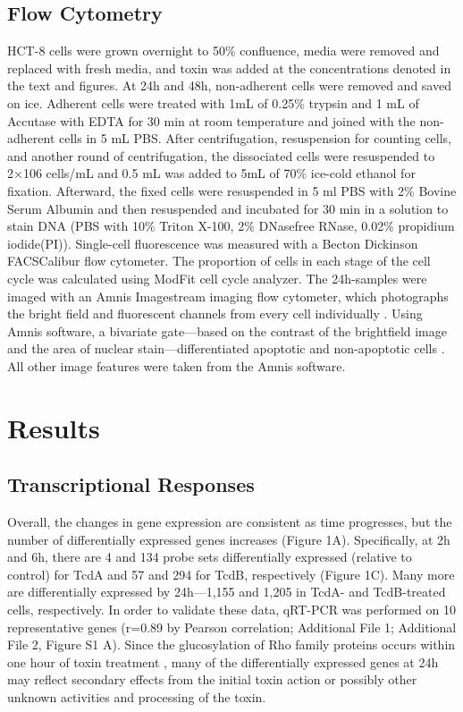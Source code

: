 \subsection{Flow Cytometry}
HCT-8 cells were grown overnight to 50\% confluence, media were removed and replaced with fresh media, and toxin was added at the concentrations denoted in the text and figures. At 24h and 48h, non-adherent cells were removed and saved on ice. Adherent cells were treated with 1mL of 0.25\% trypsin and 1 mL of Accutase with EDTA for 30 min at room temperature and joined with the non-adherent cells in 5 mL PBS. After centrifugation, resuspension for counting cells, and another round of centrifugation, the dissociated cells were resuspended to 2×106 cells/mL and 0.5 mL was added to 5mL of 70\% ice-cold ethanol for fixation. Afterward, the fixed cells were resuspended in 5 ml PBS with 2\% Bovine Serum Albumin and then resuspended and incubated for 30 min in a solution to stain DNA (PBS with 10\% Triton X-100, 2\% DNasefree RNase, 0.02\% propidium iodide(PI)). Single-cell fluorescence was measured with a Becton Dickinson FACSCalibur flow cytometer. The proportion of cells in each stage of the cell cycle was calculated using ModFit cell cycle analyzer. The 24h-samples were imaged with an Amnis Imagestream imaging flow cytometer, which photographs the bright field and fluorescent channels from every cell individually \cite{George:2004jj}. Using Amnis software, a bivariate gate—based on the contrast of the brightfield image and the area of nuclear stain—differentiated apoptotic and non-apoptotic cells \cite{Henery:2008jz}. All other image features were taken from the Amnis software.

\section{Results}

\subsection{Transcriptional Responses}

Overall, the changes in gene expression are consistent as time progresses, but the number of differentially expressed genes increases (Figure 1A). Specifically, at 2h and 6h, there are 4 and 134 probe sets differentially expressed (relative to control) for TcdA and 57 and 294 for TcdB, respectively (Figure 1C).  Many more are differentially expressed by 24h—1,155 and 1,205 in TcdA- and TcdB-treated cells, respectively. In order to validate these data, qRT-PCR was performed on 10 representative genes (r=0.89 by Pearson correlation; Additional File 1; Additional File 2, Figure S1 A). Since the glucosylation of Rho family proteins occurs within one hour of toxin treatment \cite{ChavesOlarte:1997cs}, many of the differentially expressed genes at 24h may reflect secondary effects from the initial toxin action or possibly other unknown activities and processing of the toxin.


